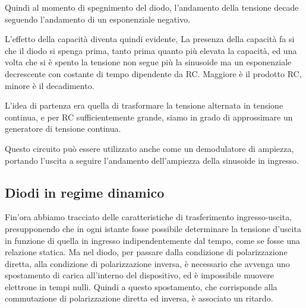 \documentclass[../elettronica]{subfiles}
\begin{document}
\noindent Quindi al momento di spegnimento del diodo, l'andamento della tensione decade seguendo l'andamento di
un esponenziale negativo.

\begin{figure}[h]
    \centering
    \def\tf{5*180/8}

\end{figure}

\noindent L'effetto della capacità diventa quindi evidente,
La presenza della capacità fa si che il diodo si spenga prima, tanto prima quanto più elevata la capacità, ed una volta
che si è spento la tensione non segue più la sinusoide ma un esponenziale decrescente con costante di
tempo dipendente da RC. Maggiore è il prodotto RC, minore è il decadimento.

L'idea di partenza era quella di trasformare la tensione alternata in tensione continua, e per RC sufficientemente grande,
siamo in grado di approssimare un generatore di tensione continua.

Questo circuito può essere utilizzato anche come un demodulatore di ampiezza, portando l'uscita a seguire l'andamento
dell'ampiezza della sinusoide in ingresso.

\newpage
\subsection{Diodi in regime dinamico}
Fin'ora abbiamo tracciato delle caratteristiche di trasferimento ingresso-uscita, presupponendo che in ogni istante
fosse possibile determinare la tensione d'uscita in funzione di quella in ingresso indipendentemente dal tempo, come
se fosse una relazione statica.
Ma nel diodo, per passare dalla condizione di polarizzazione diretta, alla condizione di polarizzazione inversa, è necessario
che avvenga uno spostamento di carica all'interno del dispositivo, ed è impossibile muovere elettrone in tempi nulli.
Quindi a questo spostamento, che corrisponde alla commutazione di polarizzazione diretta ed inversa, è associato un ritardo.
\end{document}

